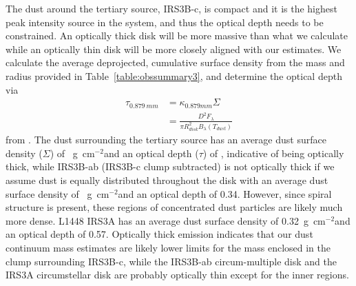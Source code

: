 \documentclass[twocolumn, 12pt, trackchanges]{aastex63}
\begin{document}
The dust around the tertiary source, IRS3B-c, is compact and it is the highest peak intensity source in the system, and thus the optical depth needs to be constrained. An optically thick disk will be more massive than what we calculate while an optically thin disk will be more closely aligned with our estimates. We calculate the average deprojected, cumulative surface density from the mass and radius provided in Table~\ref{table:obssummary3}, and determine the optical depth via 
\begin{align*}
\tau_{0.879~mm} &= \kappa_{0.879 mm}\Sigma \\
 &=\frac{D^2 F_{\lambda}}{\pi R_{disk}^{2}B_{\lambda}(T_{dust})}
\end{align*}
from \citep{2016Natur.538..483T}. The dust surrounding the tertiary source has an average dust surface density ($\Sigma$) of ~g~cm$^{-2}$\space and an optical depth ($\tau$) of , indicative of being optically thick, while IRS3B-ab (IRS3B-c clump subtracted) is not optically thick if we assume dust is equally distributed throughout the disk with an average dust surface density of ~g~cm$^{-2}$\space and an optical depth of 0.34. However, since spiral structure is present, these regions of concentrated dust particles are likely much more dense. L1448 IRS3A has an average dust surface density of 0.32~g~cm$^{-2}$\space and an optical depth of 0.57. Optically thick emission indicates that our dust continuum mass estimates are likely lower limits for the mass enclosed in the clump surrounding IRS3B-c, while the IRS3B-ab circum-multiple disk and the IRS3A circumstellar disk are probably optically thin except for the inner regions. 
\end{document}
